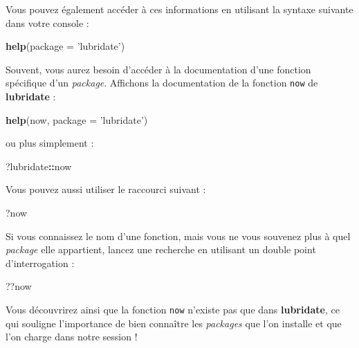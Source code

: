 \documentclass[
  11pt,
  french,
]{book}
\makeatletter
\newenvironment{Shaded}{\begin{snugshade}}{\end{snugshade}}
\newcommand{\DataTypeTok}[1]{\textcolor[rgb]{0.13,0.29,0.53}{#1}}
\newcommand{\KeywordTok}[1]{\textcolor[rgb]{0.13,0.29,0.53}{\textbf{#1}}}
\newcommand{\NormalTok}[1]{#1}
\newcommand{\OperatorTok}[1]{\textcolor[rgb]{0.81,0.36,0.00}{\textbf{#1}}}
\newcommand{\StringTok}[1]{\textcolor[rgb]{0.31,0.60,0.02}{#1}}
\newenvironment{kframe}{%
\medskip{}
\setlength{\fboxsep}{.8em}
 \def\at@end@of@kframe{}%
 \ifinner\ifhmode%
  \def\at@end@of@kframe{\end{minipage}}%
  \begin{minipage}{\columnwidth}%
 \fi\fi%
 \def\FrameCommand##1{\hskip\@totalleftmargin \hskip-\fboxsep
 \colorbox{shadecolor}{##1}\hskip-\fboxsep
     \hskip-\linewidth \hskip-\@totalleftmargin \hskip\columnwidth}%
 \MakeFramed {\advance\hsize-\width
   \@totalleftmargin\z@ \linewidth\hsize
   \@setminipage}}%
 {\par\unskip\endMakeFramed%
 \at@end@of@kframe}
\renewenvironment{Shaded}{\begin{kframe}}{\end{kframe}}
\makeatother
\begin{document}
Vous pouvez également accéder à ces informations en utilisant la syntaxe suivante dans votre console :

\begin{Shaded}
\begin{Highlighting}[]
\KeywordTok{help}\NormalTok{(}\DataTypeTok{package =} \StringTok{'lubridate'}\NormalTok{)}
\end{Highlighting}
\end{Shaded}

Souvent, vous aurez besoin d'accéder à la documentation d'une fonction spécifique d'un \emph{package}. Affichons la documentation de la fonction \texttt{now} de \textbf{lubridate} :

\begin{Shaded}
\begin{Highlighting}[]
\KeywordTok{help}\NormalTok{(now, }\DataTypeTok{package =} \StringTok{'lubridate'}\NormalTok{)}
\end{Highlighting}
\end{Shaded}

ou plus simplement :

\begin{Shaded}
\begin{Highlighting}[]
\NormalTok{?lubridate}\OperatorTok{::}\NormalTok{now}
\end{Highlighting}
\end{Shaded}

Vous pouvez aussi utiliser le raccourci suivant :

\begin{Shaded}
\begin{Highlighting}[]
\NormalTok{?now}
\end{Highlighting}
\end{Shaded}

Si vous connaissez le nom d'une fonction, mais vous ne vous souvenez plus à quel \emph{package} elle appartient, lancez une recherche en utilisant un double point d'interrogation :

\begin{Shaded}
\begin{Highlighting}[]
\NormalTok{??now}
\end{Highlighting}
\end{Shaded}

Vous découvrirez ainsi que la fonction \texttt{now} n'existe pas que dans \textbf{lubridate}, ce qui souligne l'importance de bien connaître les \emph{packages} que l'on installe et que l'on charge dans notre session !
\end{document}
